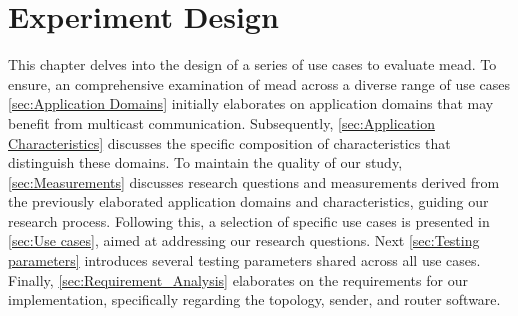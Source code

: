 \chapter{Experiment Design} %
\label{chap:Design}
This chapter delves into the design of a series of use cases to evaluate
    \gls{mead}.
To ensure, an comprehensive examination of \gls{mead} across a diverse range of
    use cases \autoref{sec:Application Domains} initially elaborates on
    application domains that may benefit from multicast communication.
Subsequently, \autoref{sec:Application Characteristics} discusses the specific
    composition of characteristics that distinguish these domains.
To maintain the quality of our study, \autoref{sec:Measurements} discusses
    research questions and measurements derived from the previously elaborated
    application domains and characteristics, guiding our research process.
Following this, a selection of specific use cases is presented in
    \autoref{sec:Use cases}, aimed at addressing our research
    questions.
Next \autoref{sec:Testing parameters} introduces several testing parameters
    shared across all use cases.
Finally, \autoref{sec:Requirement_Analysis} elaborates on the requirements for our
    implementation, specifically regarding the topology, sender, and router
    software.

